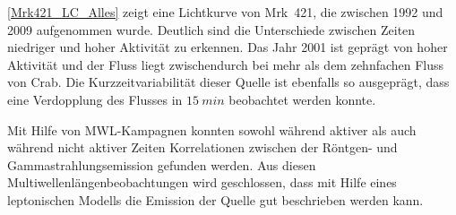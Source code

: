 \autoref{Mrk421_LC_Alles} zeigt eine Lichtkurve von Mrk~421, die zwischen 1992 und 2009 aufgenommen wurde.
Deutlich sind die Unterschiede zwischen Zeiten niedriger und hoher Aktivität zu erkennen. 
Das Jahr 2001 ist geprägt von hoher Aktivität und der Fluss liegt zwischendurch bei mehr als dem zehnfachen Fluss von Crab.\cite{Mrk421_LC_lang}
Die Kurzzeitvariabilität dieser Quelle ist ebenfalls so ausgeprägt, dass eine Verdopplung des Flusses in $\SI{15}{min}$ beobachtet werden konnte.\cite{Weekes}

Mit Hilfe von MWL-Kampagnen konnten sowohl während aktiver als auch während nicht aktiver Zeiten Korrelationen zwischen der Röntgen- und Gammastrahlungsemission gefunden werden.
Aus diesen Multiwellenlängenbeobachtungen wird geschlossen, dass mit Hilfe eines leptonischen Modells die Emission der Quelle gut beschrieben werden kann.\cite{MWL2009}


% 
% 
